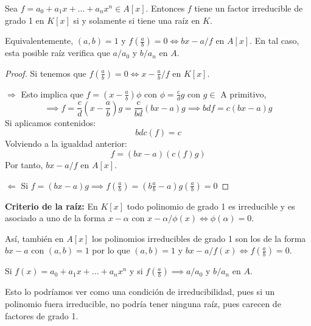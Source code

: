 \begin{nprop}
	Sea $f=a_0+a_1x+...+a_nx^n \in A[x]$. Entonces $f$ tiene un factor irreducible de grado 1 en $K[x]$ si y solamente si tiene una raíz en $K$.

	Equivalentemente, $(a,b)=1$ y $f(\frac{a}{b})=0 \iff bx-a/f$ en $A[x]$. En tal caso, esta posible raíz verifica que $a/a_0$ y $b/a_n$ en $A$.
\end{nprop}
\begin{proof}
	Si tenemos que $f(\frac{a}{b})=0 \iff x-\frac{a}{b}/f$ en $K[x]$.

	$\boxed{\Rightarrow}$ Esto implica que $f=(x-\frac{a}{b})\phi$ con $\phi=\frac{c}{d}g$ con $g \in$ A primitivo, $$\implies f= \frac{c}{d}(x-\frac{a}{b})g = \frac{c}{bd}(bx-a)g \implies bdf=c(bx-a)g$$
	Si aplicamos contenidos:
	\[
	bdc(f)=c
	\]
	Volviendo a la igualdad anterior:
	\[
	f=(bx-a)(c(f)g)
	\]
	Por tanto, $bx-a/f$ en $A[x]$.

	$\boxed{\Leftarrow}$ Si $f=(bx-a)g \implies f(\frac{a}{b}) = (b\frac{a}{b}-a)g(\frac{a}{b})=0$
\end{proof}
\textbf{Criterio de la raíz:}
En $K[x]$ todo polinomio de grado 1 es irreducible y es asociado a uno de la forma $x-\alpha$ con $x-\alpha/\phi(x)\iff \phi(\alpha) = 0$.

Así, también en $A[x]$ los polinomios irreducibles de grado 1 son los de la forma $bx-a$ con $(a,b)=1$ por lo que $(a,b)=1$ y $bx-a/f(x)\iff f(\frac{a}{b})= 0$.

Si $f(x)= a_0+a_1x+...+a_nx^n$ y si $f(\frac{a}{b}) \implies a / a_0$ y $b/a_n$ en $A$.

Esto lo podríamos ver como una condición de irreducibilidad, pues si un polinomio fuera irreducible, no podría tener ninguna raíz, pues carecen de factores de grado 1.

